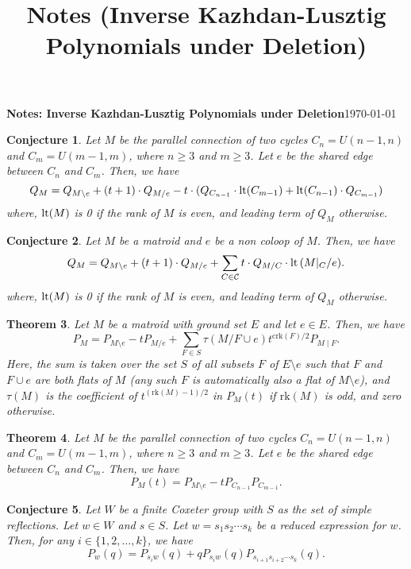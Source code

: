 \documentclass[10pt]{article}
\title{Notes (Inverse Kazhdan-Lusztig Polynomials under Deletion)}
\newcommand{\lt}{\normalfont\text{lt}}
\newtheorem{theorem}{Theorem}
\newtheorem{conjecture}[theorem]{Conjecture}
\theoremstyle{remark}
\begin{document}
{\textbf{Notes: Inverse Kazhdan-Lusztig Polynomials under Deletion}}\hfill {\small{\today}}

\hrulefill
\begin{conjecture}
    Let $M$ be the parallel connection of two cycles $C_n = U(n-1, n)$ and $C_m = U(m-1, m)$, where $n \geq 3$ and $m \geq 3$.
    Let $e$ be the shared edge between $C_n$ and $C_m$. Then, we have
    \begin{equation}
        Q_{M} = Q_{M\setminus e} + (t + 1)\cdot Q_{M/e} - t\cdot(Q_{C_{n-1}}\cdot \lt(C_{m-1}) + \lt(C_{n-1})\cdot Q_{C_{m-1}})
        \end{equation}
    where, $\lt(M)$ is 0 if the rank of $M$ is even, and leading term of $Q_M$ otherwise.
    \end{conjecture}

\begin{conjecture}
    Let $M$ be a matroid and $e$ be a non coloop of $M$. Then, we have
    \begin{equation}
        Q_{M} = Q_{M\setminus e} + (t + 1)\cdot Q_{M/e} + \sum_{C\in \mathcal{C}}{t\cdot Q_{M/C}\cdot \lt\left({M|_C /e}
        \right)}.
    \end{equation}
    where, $\lt(M)$ is 0 if the rank of $M$ is even, and leading term of $Q_M$ otherwise.
    \end{conjecture}

\begin{theorem}
    Let $M$ be a matroid with ground set $E$ and let $e \in E$. Then, we have
    \begin{equation}
        P_M = P_{M \setminus e} - t P_{M / e} + \sum_{F \in S} \tau(M/{F \cup e}) t^{\text{crk} (F)/2} P_{M\mid F}.
    \end{equation}
    Here, the sum is taken over the set $S$ of all subsets $F$ of $E \setminus e$ such that $F$ and $F \cup e$ are both flats of $M$
    (any such $F$ is automatically also a flat of $M \setminus e$), and $\tau(M)$ is the coefficient of
    $t^{(\text{rk} (M) - 1)/2}$ in $P_M(t)$ if $\text{rk} (M)$ is odd, and zero otherwise.
\end{theorem}

\begin{theorem}
    Let $M$ be the parallel connection of two cycles $C_n = U(n-1, n)$ and $C_m = U(m-1, m)$, where $n \geq 3$ and $m \geq 3$. Let $e$ be the shared edge between $C_n$ and $C_m$. Then, we have
    \begin{equation}
        P_M(t) = P_{M \setminus e} - t P_{C_{n-1}}P_{C_{m-1}}.
    \end{equation}
\end{theorem}

\begin{conjecture}
    Let $W$ be a finite Coxeter group with $S$ as the set of simple reflections. Let $w \in W$ and $s \in S$. Let $w = s_1s_2\cdots s_k$ be a reduced expression for $w$. Then, for any $i \in \{1,2,\ldots,k\}$, we have
    \begin{equation}
        P_{w}(q) = P_{s_iw}(q) + qP_{s_iw}(q)P_{s_{i+1}s_{i+2}\cdots s_k}(q).
    \end{equation}
    \end{conjecture}
\end{document}

